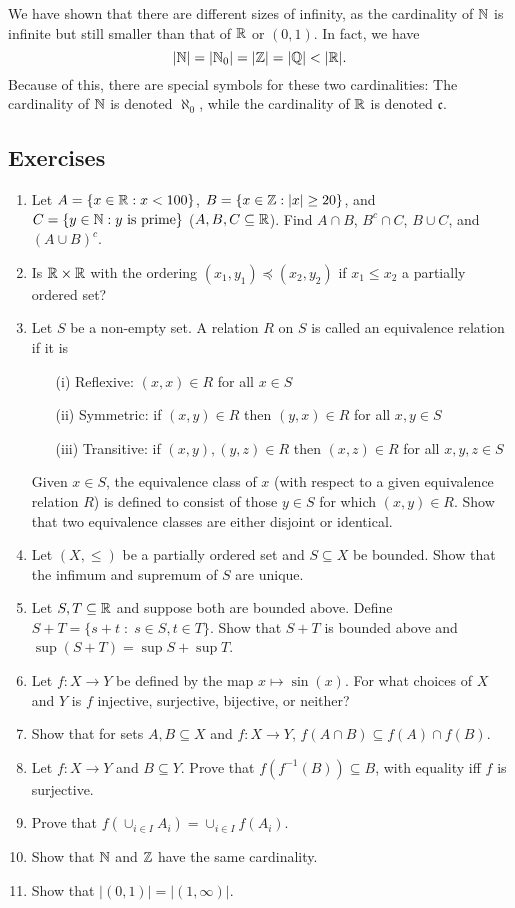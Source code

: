 \documentclass{article}
\begin{document}
We have shown that there are different sizes of infinity, as the cardinality of ${\mathbb{N}}$ is infinite but still smaller than that of ${\mathbb{R}}$ or $(0,1)$. In fact, we have
$$ |{\mathbb{N}}| = |{\mathbb{N}}_0| = |{\mathbb{Z}}| = |{\mathbb{Q}}| < | {\mathbb{R}}|.$$
Because of this, there are special symbols for these two cardinalities: The cardinality of ${\mathbb{N}}$ is denoted $\aleph_0$, while the cardinality of ${\mathbb{R}}$ is denoted $\mathfrak{c}$. 
\subsection{Exercises}
\begin{enumerate}
	\item Let $A = \{x\in {\mathbb{R}} : x <100\}$, $B = \{x\in {\mathbb{Z}} : |x| \geq 20\}$, and $C = \{y \in {\mathbb{N}} : y \text{ is prime}\}$ ($A,B,C \subseteq {\mathbb{R}}$). Find $A \cap B$, $B^c \cap C$, $B \cup C$, and $(A \cup B )^c$.
    \item Is ${\mathbb{R}} \times {\mathbb{R}}$ with the ordering $(x_1,y_1) \preceq (x_2,y_2)$ if $x_1 \leq x_2$ a partially ordered set? 
     \item \cite[Exercise 1.3.1]{tastetopology} Let $S$ be a non-empty set. A relation $R$ on $S$ is called an equivalence relation if it is
    \begin{enumerate}
        \item[(i)] Reflexive: $(x,x) \in R$ for all $x \in S$
        \item[(ii)] Symmetric: if $(x,y) \in R$  then $(y,x) \in R$ for all $x,y \in S$
        \item[(iii)] Transitive: if $(x,y), (y,z) \in R$ then $(x,z) \in R$ for all $x,y,z \in S$
    \end{enumerate}
Given $x \in S$, the equivalence class of $x$ (with respect to a given equivalence relation $R$) is defined to consist of those $y \in S$ for which $(x,y) \in R$. Show that two equivalence classes are either disjoint or identical.
    \item Let $(X, \leq)$ be a partially ordered set and $S\subseteq X$ be bounded. Show that the infimum and supremum of $S$ are unique.
    \item Let $S,T \subseteq {\mathbb{R}}$ and suppose both are bounded above. Define $S+T = \{s + t \; \colon \; s\in S,t\in T\}$. Show that $S+T$ is bounded above and $\sup(S+T) = \sup S + \sup T$. 
    \item Let $f: X \to Y$ be defined by the map $x \mapsto \sin(x)$. For what choices of $X$ and $Y$ is $f$ injective, surjective, bijective, or neither?
    \item Show that for sets $A,B \subseteq X$ and $f: X \to Y$, $f(A \cap B) \subseteq f(A) \cap f(B)$.
    \item Let $f: X \to Y$ and $B \subseteq Y$. Prove that $f(f^{-1}(B)) \subseteq B$, with equality iff $f$ is surjective.
    \item Prove that $f(\cup_{i \in I}A_i) = \cup_{i \in I}f(A_i)$.
    \item Show that ${\mathbb{N}}$ and ${\mathbb{Z}}$ have the same cardinality. 
    \item Show that $|(0,1)| =|(1,\infty)|$.
\end{enumerate}
\end{document}
